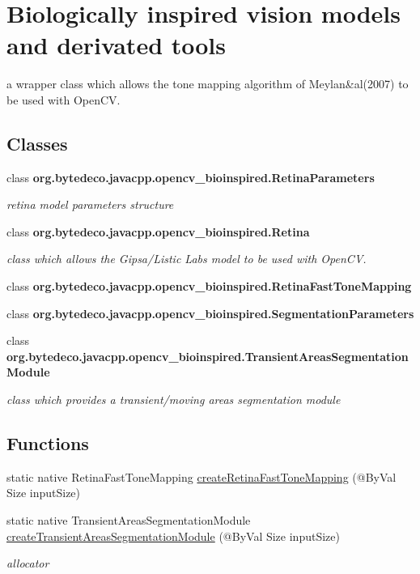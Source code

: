 \hypertarget{group__bioinspired}{}\section{Biologically inspired vision models and derivated tools}
\label{group__bioinspired}


a wrapper class which allows the tone mapping algorithm of Meylan\&al(2007) to be used with Open\+CV.  


\subsection*{Classes}
\begin{DoxyCompactItemize}
\item 
class {\bfseries org.\+bytedeco.\+javacpp.\+opencv\+\_\+bioinspired.\+Retina\+Parameters}
\begin{DoxyCompactList}\small\item\em retina model parameters structure \end{DoxyCompactList}\item 
class {\bfseries org.\+bytedeco.\+javacpp.\+opencv\+\_\+bioinspired.\+Retina}
\begin{DoxyCompactList}\small\item\em class which allows the Gipsa/\+Listic Labs model to be used with Open\+CV. \end{DoxyCompactList}\item 
class {\bfseries org.\+bytedeco.\+javacpp.\+opencv\+\_\+bioinspired.\+Retina\+Fast\+Tone\+Mapping}
\item 
class {\bfseries org.\+bytedeco.\+javacpp.\+opencv\+\_\+bioinspired.\+Segmentation\+Parameters}
\item 
class {\bfseries org.\+bytedeco.\+javacpp.\+opencv\+\_\+bioinspired.\+Transient\+Areas\+Segmentation\+Module}
\begin{DoxyCompactList}\small\item\em class which provides a transient/moving areas segmentation module \end{DoxyCompactList}\end{DoxyCompactItemize}
\subsection*{Functions}
\begin{DoxyCompactItemize}
\item 
static native Retina\+Fast\+Tone\+Mapping \hyperlink{group__bioinspired_ga8193701044bddfabf0e07b3e3a3a7f4c}{create\+Retina\+Fast\+Tone\+Mapping} (@By\+Val Size input\+Size)
\item 
static native Transient\+Areas\+Segmentation\+Module \hyperlink{group__bioinspired_gac278083089d25770df4077c91d0846a0}{create\+Transient\+Areas\+Segmentation\+Module} (@By\+Val Size input\+Size)
\begin{DoxyCompactList}\small\item\em allocator \end{DoxyCompactList}\end{DoxyCompactItemize}
